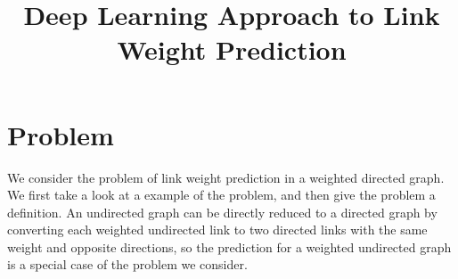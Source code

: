 \documentclass[letterpaper]{article}
\title{Deep Learning Approach to Link Weight Prediction}
\begin{document}
\maketitle

\section{Problem}
We consider the problem of link weight prediction in a weighted directed graph.
We first take a look at a example of the problem,
and then give the problem a definition.
An undirected graph can be directly reduced to a directed graph by converting each weighted undirected link to two directed links with the same weight and opposite directions,
so the prediction for a weighted undirected graph is a special case of the problem we consider.
\end{document}
